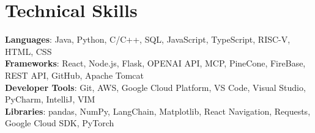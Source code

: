 \documentclass[letterpaper,11pt]{article}
\begin{document}
\section{Technical Skills}
 \begin{itemize}[leftmargin=0.15in, label={}]
    \small{\item{
     \textbf{Languages}{: Java, Python, C/C++, SQL, JavaScript, TypeScript, RISC-V, HTML, CSS} \\
     \textbf{Frameworks}{: React, Node.js, Flask, OPENAI API, MCP, PineCone, FireBase, REST API, GitHub, Apache Tomcat} \\
     \textbf{Developer Tools}{: Git, AWS, Google Cloud Platform, VS Code, Visual Studio, PyCharm, IntelliJ, VIM} \\
     \textbf{Libraries}{: pandas, NumPy, LangChain, Matplotlib, React Navigation, Requests, Google Cloud SDK, PyTorch}
    }}
 \end{itemize}

 


\end{document}
